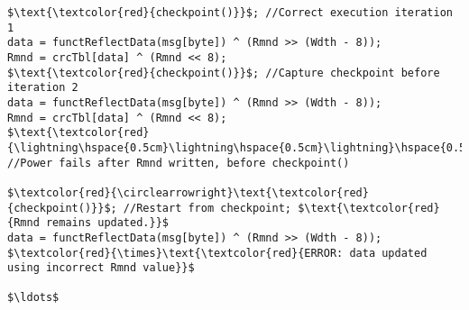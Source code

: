 \documentclass[border={20pt 5pt 25pt 10pt}]{standalone} %
\begin{document}
	

\begin{lstlisting}[style = mystyle]
$\text{\textcolor{red}{checkpoint()}}$; //Correct execution iteration 1 
data = functReflectData(msg[byte]) ^ (Rmnd >> (Wdth - 8));
Rmnd = crcTbl[data] ^ (Rmnd << 8);
$\text{\textcolor{red}{checkpoint()}}$; //Capture checkpoint before iteration 2
data = functReflectData(msg[byte]) ^ (Rmnd >> (Wdth - 8));
Rmnd = crcTbl[data] ^ (Rmnd << 8);      
$\text{\textcolor{red}{\lightning\hspace{0.5cm}\lightning\hspace{0.5cm}\lightning}\hspace{0.5cm}}$ //Power fails after Rmnd written, before checkpoint()

$\textcolor{red}{\circlearrowright}\text{\textcolor{red}{checkpoint()}}$; //Restart from checkpoint; $\text{\textcolor{red}{Rmnd remains updated.}}$
data = functReflectData(msg[byte]) ^ (Rmnd >> (Wdth - 8)); 
$\textcolor{red}{\times}\text{\textcolor{red}{ERROR: data updated using incorrect Rmnd value}}$

$\ldots$
\end{lstlisting} 
\end{document}
